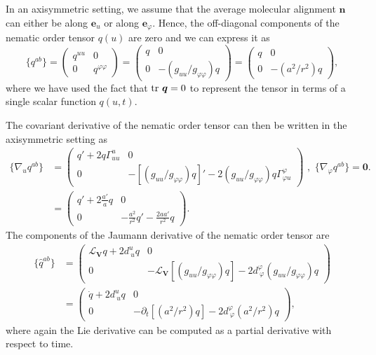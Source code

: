 In an axisymmetric setting, we assume that the average molecular alignment $\bm{n}$ can either be  along $\bm{e}_u$ or along $\bm{e}_\varphi$. Hence,  the off-diagonal components of the nematic order tensor $q(u)$ are zero and we can express it as
\begin{equation} \label{24_III}
  \{ q^{ab} \} = \begin{pmatrix}
q^{uu} &0 \\ 
0 & q^{\varphi \varphi}
\end{pmatrix} =  \begin{pmatrix}
q &0 \\ 
0 & -  (g_{uu}/g_{\varphi \varphi}) q
\end{pmatrix}=  \begin{pmatrix}
q &0 \\ 
0 & - (a^2/r^2) q 
\end{pmatrix}, 
\end{equation}
where  we have used the fact that  $\textup{tr}~\bm{q}=0$ to represent the tensor in terms of a single scalar function $q(u,t)$.

The covariant derivative of the nematic order tensor can then be written in the axisymmetric setting as
\begin{align}  \label{13_III}
    \{\nabla_u q^{ab}\} & = \begin{pmatrix}   q'+ 2q \Gamma^u_{uu} & 0  \\
0 &  -[(g_{uu}/g_{\varphi \varphi}) q]' - 2(g_{uu}/g_{\varphi \varphi}) q \Gamma^\varphi_{\varphi u}  \end{pmatrix} \, \, , \, \, \{\nabla_\varphi q^{ab}\} = \bm{0}.  \\
& = \begin{pmatrix}   q'+ 2\frac{a'}{a} q  & 0  \\
0 &  - \frac{a^2}{r^2} q' - \frac{2 a a'}{r^2} q    \nonumber   
\end{pmatrix}.
\end{align}
The components of the Jaumann derivative of the nematic order tensor are 
\begin{align}  \label{14_III}
    \{\widehat{q}^{ab}\}  & = \begin{pmatrix}
\mathcal{L}_{\bm{V}} q + 2d^{u}_{~u}q & 0  \\
0 &  - \mathcal{L}_{\bm{V}} [(g_{uu}/g_{\varphi \varphi}) q] - 2d^{\varphi}_{~\varphi}(g_{uu}/g_{\varphi \varphi}) q 
\end{pmatrix} \\
 & = \begin{pmatrix}
\dot{q} + 2d^{u}_{~u}q & 0  \\
0 &  - \partial_t[(a^2/r^2) q] - 2d^{\varphi}_{~\varphi}(a^2/r^2) q 
\end{pmatrix}, \nonumber
\end{align}
where again the Lie derivative can be computed as a partial derivative with respect to time. 


